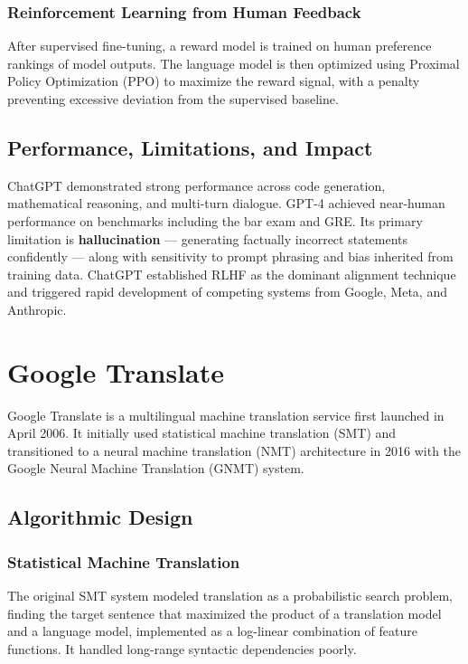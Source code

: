 \documentclass[12pt,a4paper]{report}
\begin{document}
\subsubsection{Reinforcement Learning from Human Feedback}
After supervised fine-tuning, a reward model is trained on human preference rankings of model outputs. The language model is then optimized using Proximal Policy Optimization (PPO) to maximize the reward signal, with a penalty preventing excessive deviation from the supervised baseline.

\subsection{Performance, Limitations, and Impact}
ChatGPT demonstrated strong performance across code generation, mathematical reasoning, and multi-turn dialogue. GPT-4 achieved near-human performance on benchmarks including the bar exam and GRE. Its primary limitation is \textbf{hallucination} — generating factually incorrect statements confidently — along with sensitivity to prompt phrasing and bias inherited from training data. ChatGPT established RLHF as the dominant alignment technique and triggered rapid development of competing systems from Google, Meta, and Anthropic.

\section{Google Translate}
Google Translate is a multilingual machine translation service first launched in April 2006. It initially used statistical machine translation (SMT) and transitioned to a neural machine translation (NMT) architecture in 2016 with the Google Neural Machine Translation (GNMT) system.
\subsection{Algorithmic Design}

\subsubsection{Statistical Machine Translation}
The original SMT system modeled translation as a probabilistic search problem, finding the target sentence that maximized the product of a translation model and a language model, implemented as a log-linear combination of feature functions. It handled long-range syntactic dependencies poorly.
\end{document}
